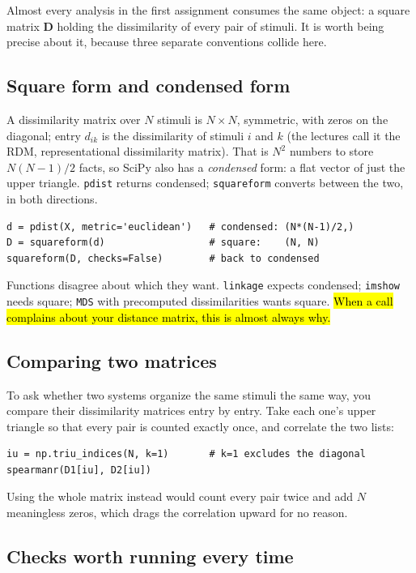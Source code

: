 \documentclass[11pt]{article}
\begin{document}
Almost every analysis in the first assignment consumes the same object: a
square matrix $\bm{D}$ holding the dissimilarity of every pair of stimuli. It is
worth being precise about it, because three separate conventions collide here.

\subsection{Square form and condensed form}

A dissimilarity matrix over $N$ stimuli is $N \times N$, symmetric, with zeros
on the diagonal; entry $d_{ik}$ is the dissimilarity of stimuli $i$ and $k$ (the
lectures call it the RDM, representational dissimilarity matrix). That is $N^2$
numbers to store $N(N-1)/2$ facts, so SciPy also
has a \emph{condensed} form: a flat vector of just the upper triangle.
\texttt{pdist} returns condensed; \texttt{squareform} converts between the two,
in both directions.

\begin{lstlisting}
d = pdist(X, metric='euclidean')   # condensed: (N*(N-1)/2,)
D = squareform(d)                  # square:    (N, N)
squareform(D, checks=False)        # back to condensed
\end{lstlisting}

Functions disagree about which they want. \texttt{linkage} expects condensed;
\texttt{imshow} needs square; \texttt{MDS} with precomputed dissimilarities
wants square. \hl{When a call complains about your distance matrix, this is
almost always why.}

\subsection{Comparing two matrices}

To ask whether two systems organize the same stimuli the same way, you compare
their dissimilarity matrices entry by entry. Take each one's upper triangle so
that every pair is counted exactly once, and correlate the two lists:

\begin{lstlisting}
iu = np.triu_indices(N, k=1)       # k=1 excludes the diagonal
spearmanr(D1[iu], D2[iu])
\end{lstlisting}

Using the whole matrix instead would count every pair twice and add $N$
meaningless zeros, which drags the correlation upward for no reason.

\subsection{Checks worth running every time}
\end{document}
